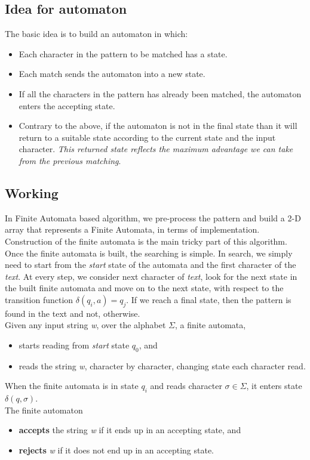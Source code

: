 \documentclass[12pt,a4paper]{article}%
\begin{document}
		\subsection{Idea for automaton}
		The basic idea is to build an automaton in which:
		\begin{itemize}
			\item {Each character in the pattern to be matched has a state.}
			\item {Each match sends the automaton into a new state.}
			\item {If all the characters in the pattern has already been matched, the automaton enters the accepting state.}
			\item {Contrary to the above, if the automaton is not in the final state than it will return to a suitable state according to the current state and the input character.\textit{ This returned state reflects the maximum advantage we can take from the previous matching}.}
		\end{itemize}
		\subsection{Working}
		\begin{flushleft}
		In Finite Automata based algorithm, we pre-process the pattern and build a 2-D array that represents a Finite Automata, in terms of implementation. Construction of the finite automata is the main tricky part of this algorithm. Once the finite automata is built, the searching is simple. In search, we simply need to start from the \textit{start} state of the automata and the first character of the \textit{text}. At every step, we consider next character of \textit{text}, look for the next state in the built finite automata and move on to the next state, with respect to the transition function $\delta(q_i,a)=q_j$. If we reach a final state, then the pattern is found in the text and not, otherwise.\\\bigskip
		Given any input string \textit{w}, over the alphabet $\Sigma$, a finite automata,
		\begin{itemize}
			\item{starts reading from \textit{start} state $q_0$, and}
			\item{reads the string \textit{w}, character by character, changing state each character read.}
		\end{itemize}
		When the finite automata is in state $q_i$ and reads character $\sigma \in \Sigma$, it enters state $\delta(q,\sigma)$.\\\bigskip
		The finite automaton
		\begin{itemize}
			\item{\textbf{accepts} the string \textit{w} if it ends up in an accepting state, and}
			\item{\textbf{rejects} \textit{w} if it does not end up in an accepting state.}
		\end{itemize}
		\pagebreak
		\end{flushleft}
\end{document}
